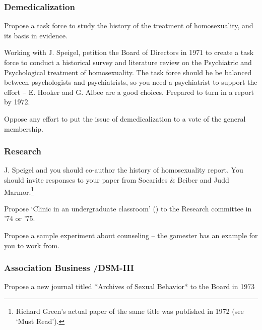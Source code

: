 \begin{refsection}
\subsubsection{Demedicalization}
\label{demedicalization}

\begin{proposal}[Green]\label{proposal:green}
Propose a task force to study the history of the treatment of homosexuality, and its basis in evidence. \end{proposal}

Working with J. Speigel, petition the Board of Directors in 1971 to create a task force to conduct a historical survey and literature review on the Psychiatric and Psychological treatment of homosexuality. The task force should be be balanced between psychologists and psychiatrists, so you need a psychiatrist to support the effort – E. Hooker and G. Albee are a good choices. Prepared to turn in a report by 1972.

Oppose any effort to put the issue of demedicalization to a vote of the general membership.

\subsubsection{Research}
\label{research}

J. Speigel and you should co-author the history of homosexuality report. You should invite responses to your paper from Socarides \& Beiber and Judd Marmor.\footnote{Richard Green's actual paper of the same title was published in 1972 (see `Must Read').}

\begin{researchtask}[Green]\label{research:green}
Propose ‘Clinic in an undergraduate classroom’ () to the Research committee in ’74 or ’75.
\end{researchtask}

Propose a sample experiment about counseling -- the gamester has an example for you to work from.

\subsubsection{Association Business \slash  DSM-III}
\label{associationbusinessdsm-iii}

\begin{proposal}[Green]\label{proposal:greenB} Propose a new journal titled *Archives of Sexual Behavior* to the Board in 1973\end{proposal}


\end{refsection}
